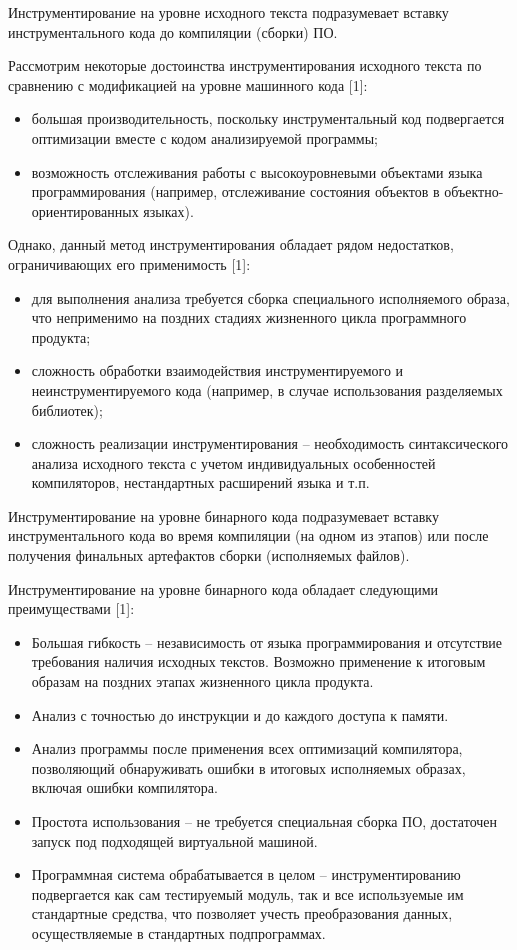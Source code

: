 Инструментирование на уровне исходного текста подразумевает вставку инструментального кода до компиляции (сборки) ПО.

Рассмотрим некоторые достоинства инструментирования исходного текста по сравнению с модификацией на уровне машинного кода [1]:
\begin{itemize}
  \item большая производительность, поскольку инструментальный код подвергается оптимизации вместе с кодом анализируемой программы;
  \item возможность отслеживания работы с высокоуровневыми объектами языка программирования (например, отслеживание состояния объектов в объектно-ориентированных языках).
\end{itemize}

Однако, данный метод инструментирования обладает рядом недостатков, ограничивающих его применимость [1]:
\begin{itemize}
  \item для выполнения анализа требуется сборка специального исполняемого образа, что неприменимо на поздних стадиях жизненного цикла программного продукта;
  \item сложность обработки взаимодействия инструментируемого и неинструментируемого кода (например, в случае использования разделяемых библиотек);
  \item сложность реализации инструментирования -- необходимость синтаксического анализа исходного текста с учетом индивидуальных особенностей компиляторов, нестандартных расширений языка и т.п.
\end{itemize}

Инструментирование на уровне бинарного кода подразумевает вставку инструментального кода во время компиляции (на одном из этапов) или после получения финальных артефактов сборки (исполняемых файлов).

Инструментирование на уровне бинарного кода обладает следующими преимуществами [1]:
\begin{itemize}
  \item Большая гибкость -- независимость от языка программирования и отсутствие требования наличия исходных текстов. Возможно применение к итоговым образам на поздних этапах жизненного цикла продукта.
  \item Анализ с точностью до инструкции и до каждого доступа к памяти.
  \item Анализ программы после применения всех оптимизаций компилятора, позволяющий обнаруживать ошибки в итоговых исполняемых образах, включая ошибки компилятора.
  \item Простота использования -- не требуется специальная сборка ПО, достаточен запуск под подходящей виртуальной машиной.
  \item Программная система обрабатывается в целом -- инструментированию подвергается как сам тестируемый модуль, так и все используемые им стандартные средства, что позволяет учесть преобразования данных, осуществляемые в стандартных подпрограммах.
\end{itemize}

